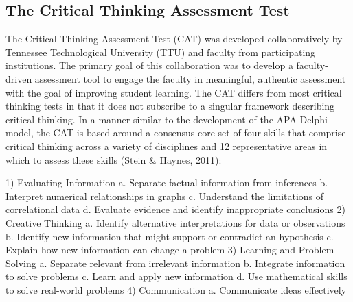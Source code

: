 \subsection{The Critical Thinking Assessment Test}

The Critical Thinking Assessment Test (CAT) was developed collaboratively by Tennessee Technological University (TTU) and faculty from participating institutions. The primary goal of this collaboration was to develop a faculty-driven assessment tool to engage the faculty in meaningful, authentic assessment with the goal of improving student learning. The CAT differs from most critical thinking tests in that it does not subscribe to a singular framework describing critical thinking. In a manner similar to the development of the APA Delphi model, the CAT is based around a consensus core set of four skills that comprise critical thinking across a variety of disciplines and 12 representative areas in which to assess these skills (Stein & Haynes, 2011):

1)	Evaluating Information
a.	Separate factual information from inferences
b.	Interpret numerical relationships in graphs
c.	Understand the limitations of correlational data
d.	Evaluate evidence and identify inappropriate conclusions
2)	Creative Thinking
a.	Identify alternative interpretations for data or observations
b.	Identify new information that might support or contradict an hypothesis
c.	Explain how new information can change a problem		
3)	Learning and Problem Solving
a.	Separate relevant from irrelevant information
b.	Integrate information to solve problems
c.	Learn and apply new information
d.	Use mathematical skills to solve real-world problems
4)	Communication
a.	Communicate ideas effectively

